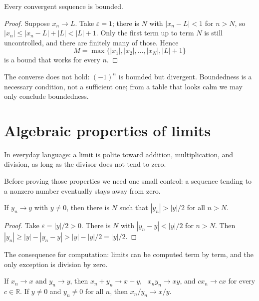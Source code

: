 \begin{teorema}
Every convergent sequence is bounded.
\end{teorema}

\begin{proof}
Suppose $x_n \to L$. Take $\varepsilon=1$; there is $N$ with $|x_n-L|<1$ for
$n>N$, so $|x_n| \le |x_n-L|+|L| < |L|+1$. Only the first term up to term $N$ is
still uncontrolled, and there are finitely many of those. Hence
\[
M=\max\{|x_1|,|x_2|,\dots,|x_N|,|L|+1\}
\]
is a bound that works for every $n$.
\end{proof}

The converse does not hold: $(-1)^n$ is bounded but divergent. Boundedness is a
necessary condition, not a sufficient one; from a table that looks calm we may only
conclude boundedness.

\section{Algebraic properties of limits}

In everyday language: a limit is polite toward addition, multiplication, and
division, as long as the divisor does not tend to zero.

Before proving those properties we need one small control: a sequence tending to a
nonzero number eventually stays away from zero.

\begin{lemma}
If $y_n \to y$ with $y \neq 0$, then there is $N$ such that $|y_n|>|y|/2$ for all
$n>N$.
\end{lemma}

\begin{proof}
Take $\varepsilon=|y|/2>0$. There is $N$ with $|y_n-y|<|y|/2$ for $n>N$. Then
$|y_n| \ge |y|-|y_n-y| > |y|-|y|/2 = |y|/2$.
\end{proof}

The consequence for computation: limits can be computed term by term, and the only
exception is division by zero.

\begin{teorema}
If $x_n \to x$ and $y_n \to y$, then
$x_n+y_n \to x+y$, \ $x_n y_n \to xy$, and $c x_n \to cx$ for every
$c \in \mathbb{R}$. If $y \neq 0$ and $y_n \neq 0$ for all $n$, then
$x_n/y_n \to x/y$.
\end{teorema}

